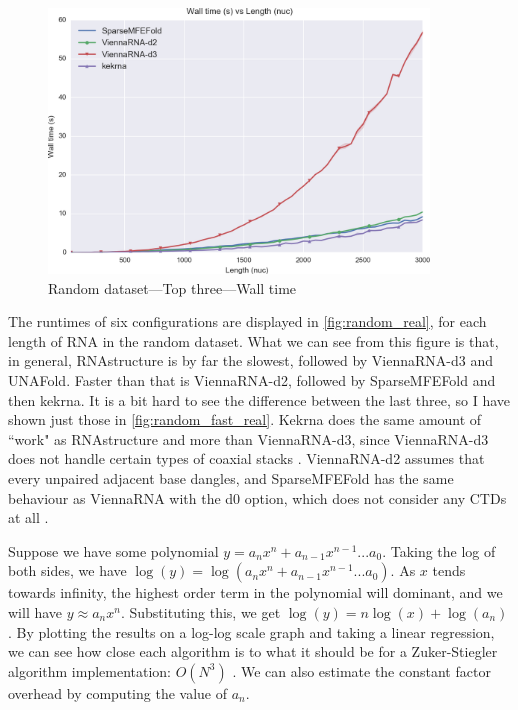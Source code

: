 \documentclass{cshonours}
\begin{document}
\begin{figure}[p]
\centering
\includegraphics[width=0.9\textwidth]{res/random_fast_real.png}
\caption{Random dataset---Top three---Wall time}
\label{fig:random_fast_real}
\end{figure}

The runtimes of six configurations are displayed in \autoref{fig:random_real}, for each length of RNA in the random dataset. What we can see from this figure is that, in general, RNAstructure is by far the slowest, followed by ViennaRNA-d3 and UNAFold. Faster than that is ViennaRNA-d2, followed by SparseMFEFold and then kekrna. It is a bit hard to see the difference between the last three, so I have shown just those in \autoref{fig:random_fast_real}. Kekrna does the same amount of ``work" as RNAstructure and more than ViennaRNA-d3, since ViennaRNA-d3 does not handle certain types of coaxial stacks \cite{viennaBroken}. ViennaRNA-d2 assumes that every unpaired adjacent base dangles, and SparseMFEFold has the same behaviour as ViennaRNA with the d0 option, which does not consider any CTDs at all \cite{willSparseFolding}.

Suppose we have some polynomial $y = a_n x^n + a_{n-1}x^{n-1} ... a_0$. Taking the log of both sides, we have $\log(y) = \log(a_n x^n + a_{n-1}x^{n-1} ... a_0)$. As $x$ tends towards infinity, the highest order term in the polynomial will dominant, and we will have $y \approx a_n x^n$. Substituting this, we get $\log(y) = n \log(x) + \log(a_n)$. By plotting the results on a log-log scale graph and taking a linear regression, we can see how close each algorithm is to what it should be for a Zuker-Stiegler algorithm implementation: $O(N^3)$ \cite{zukerDp}. We can also estimate the constant factor overhead by computing the value of $a_n$.
\end{document}
